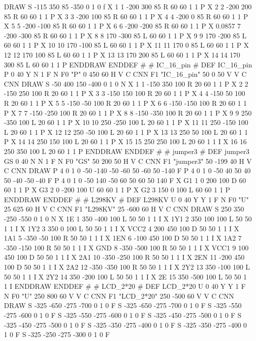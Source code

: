 DRAW
S -115 350 85 -350 0 1 0 f
X 1 1 -200 300 85 R 60 60 1 1 P
X 2 2 -200 200 85 R 60 60 1 1 P
X 3 3 -200 100 85 R 60 60 1 1 P
X 4 4 -200 0 85 R 60 60 1 1 P
X 5 5 -200 -100 85 R 60 60 1 1 P
X 6 6 -200 -200 85 R 60 60 1 1 P
X 0.0857 7 -200 -300 85 R 60 60 1 1 P
X 8 8 170 -300 85 L 60 60 1 1 P
X 9 9 170 -200 85 L 60 60 1 1 P
X 10 10 170 -100 85 L 60 60 1 1 P
X 11 11 170 0 85 L 60 60 1 1 P
X 12 12 170 100 85 L 60 60 1 1 P
X 13 13 170 200 85 L 60 60 1 1 P
X 14 14 170 300 85 L 60 60 1 1 P
ENDDRAW
ENDDEF
#
# IC_16_pin
#
DEF IC_16_pin P 0 40 Y N 1 F N
F0 "P" 0 450 60 H V C CNN
F1 "IC_16_pin" 50 0 50 V V C CNN
DRAW
S -50 400 150 -400 0 1 0 N
X 1 1 -150 350 100 R 20 60 1 1 P
X 2 2 -150 250 100 R 20 60 1 1 P
X 3 3 -150 150 100 R 20 60 1 1 P
X 4 4 -150 50 100 R 20 60 1 1 P
X 5 5 -150 -50 100 R 20 60 1 1 P
X 6 6 -150 -150 100 R 20 60 1 1 P
X 7 7 -150 -250 100 R 20 60 1 1 P
X 8 8 -150 -350 100 R 20 60 1 1 P
X 9 9 250 -350 100 L 20 60 1 1 P
X 10 10 250 -250 100 L 20 60 1 1 P
X 11 11 250 -150 100 L 20 60 1 1 P
X 12 12 250 -50 100 L 20 60 1 1 P
X 13 13 250 50 100 L 20 60 1 1 P
X 14 14 250 150 100 L 20 60 1 1 P
X 15 15 250 250 100 L 20 60 1 1 I
X 16 16 250 350 100 L 20 60 1 1 P
ENDDRAW
ENDDEF
#
# jumper3
#
DEF jumper3 GS 0 40 N N 1 F N
F0 "GS" 50 200 50 H V C CNN
F1 "jumper3" 50 -199 40 H V C CNN
DRAW
P 4 0 1 0  -50 -140  -50 -60  50 -60  50 -140 F
P 4 0 1 0  -50 40  50 40  50 -40  -50 -40 F
P 4 0 1 0  -50 140  -50 60  50 60  50 140 F
X G1 1 0 200 100 D 60 60 1 1 P
X G3 2 0 -200 100 U 60 60 1 1 P
X G2 3 150 0 100 L 60 60 1 1 P
ENDDRAW
ENDDEF
#
# L298KV
#
DEF L298KV U 0 40 Y Y 1 F N
F0 "U" 25 625 60 H V C CNN
F1 "L298KV" 25 -600 60 H V C CNN
DRAW
S 250 350 -250 -550 0 1 0 N
X 1E 1 350 -400 100 L 50 50 1 1 I
X 1Y1 2 350 100 100 L 50 50 1 1 I
X 1Y2 3 350 0 100 L 50 50 1 1 I
X VCC2 4 200 450 100 D 50 50 1 1 I
X 1A1 5 -350 -50 100 R 50 50 1 1 I
X 1EN 6 -100 450 100 D 50 50 1 1 I
X 1A2 7 -350 -150 100 R 50 50 1 1 I
X GND 8 -350 -500 100 R 50 50 1 1 I
X VCC1 9 100 450 100 D 50 50 1 1 I
X 2A1 10 -350 -250 100 R 50 50 1 1 I
X 2EN 11 -200 450 100 D 50 50 1 1 I
X 2A2 12 -350 -350 100 R 50 50 1 1 I
X 2Y2 13 350 -100 100 L 50 50 1 1 I
X 2Y2 14 350 -200 100 L 50 50 1 1 I
X 2E 15 350 -500 100 L 50 50 1 1 I
ENDDRAW
ENDDEF
#
# LCD_2*20
#
DEF LCD_2*20 U 0 40 Y Y 1 F N
F0 "U" 250 800 60 V V C CNN
F1 "LCD_2*20" 250 -500 60 V V C CNN
DRAW
S -325 -650 -275 -700 0 1 0 F
S -325 -650 -275 -700 0 1 0 F
S -325 -550 -275 -600 0 1 0 F
S -325 -550 -275 -600 0 1 0 F
S -325 -450 -275 -500 0 1 0 F
S -325 -450 -275 -500 0 1 0 F
S -325 -350 -275 -400 0 1 0 F
S -325 -350 -275 -400 0 1 0 F
S -325 -250 -275 -300 0 1 0 F
